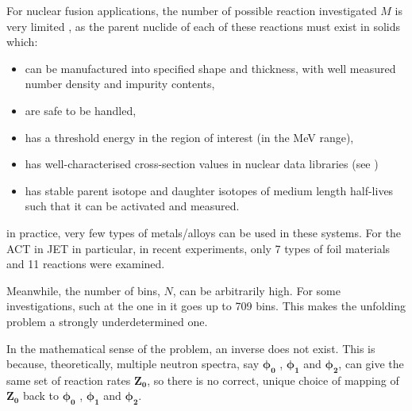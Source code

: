 \documentclass[a4paper, 12pt]{article}
\newcommand{\ve}[1]{\boldsymbol{#1}}
\begin{document}
For nuclear fusion applications, the number of possible reaction investigated $M$ is very limited \cite{MaterialSelection}, as the parent nuclide of each of these reactions must exist in solids which:
\begin{itemize}
    \item can be manufactured into specified shape and thickness, with well measured number density and impurity contents,
    \item are safe to be handled,
    \item has a threshold energy in the region of interest (in the MeV range),
    \item has well-characterised cross-section values in nuclear data libraries (see \cite{MaterialSelectionASTM})
    \item has stable parent isotope and daughter isotopes of medium length half-lives such that it can be activated and measured.
\end{itemize}
in practice, very few types of metals/alloys can be used in these systems. For the ACT in JET in particular, in recent experiments, only 7 types of foil materials and 11 reactions were examined. \cite{LWP_LTIS}

Meanwhile, the number of bins, $N$, can be arbitrarily high. For some investigations, such at the one in \cite{EmbargoPaper_LWP} it goes up to 709 bins. 
This makes the unfolding problem a strongly underdetermined one.

In the mathematical sense of the problem, an inverse does not exist. This is because, theoretically, multiple neutron spectra, say $\ve{\phi_0}$ , $\ve{\phi_1}$ and $\ve{\phi_2}$, can give the same set of reaction rates $\ve{Z_0}$, so there is no correct, unique choice of mapping of $\ve{Z_0}$ back to $\ve{\phi_0}$ , $\ve{\phi_1}$ and $\ve{\phi_2}$. 


\end{document}

